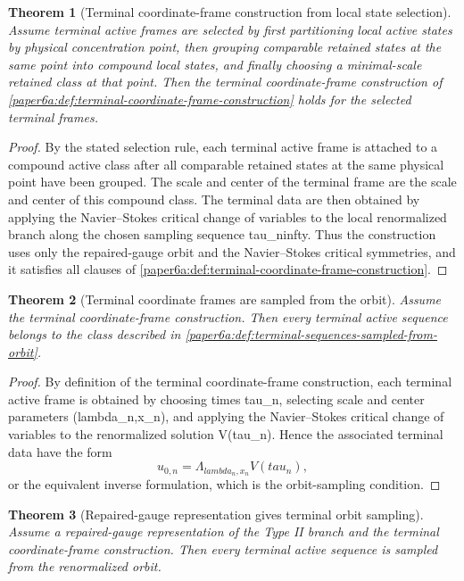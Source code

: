 \documentclass[11pt]{amsart}
\def\({}%
\def\){}%
\def\tau{tau}%
\def\lambda{lambda}%
\def\infty{infty}%
\theoremstyle{plain}
\newtheorem{theorem}{Theorem}[section]
\theoremstyle{definition}
\theoremstyle{remark}
\begin{document}
\begin{theorem}[Terminal coordinate-frame construction from local state selection]
\label{paper6a:thm:terminal-coordinate-frame-construction-profile-selection}
Assume terminal active frames are selected by first partitioning local active
states by physical concentration point, then grouping comparable retained
states at the same point into compound local states, and finally choosing a
minimal-scale retained class at that point.  Then the terminal coordinate-frame
construction of \cref{paper6a:def:terminal-coordinate-frame-construction} holds
for the selected terminal frames.
\end{theorem}

\begin{proof}
By the stated selection rule, each terminal active frame is attached to a
compound active class after all comparable retained states at the same physical
point have been grouped.  The scale and center of the terminal frame are the
scale and center of this compound class.  The terminal data are then obtained
by applying the Navier--Stokes critical change of variables to the local
renormalized branch along the chosen sampling sequence \(\tau_n\to\infty\).
Thus the construction uses only the repaired-gauge orbit and the
Navier--Stokes critical symmetries, and it satisfies all clauses of
\cref{paper6a:def:terminal-coordinate-frame-construction}.
\end{proof}

\begin{theorem}[Terminal coordinate frames are sampled from the orbit]
\label{paper6a:thm:terminal-coordinate-frames-sampled}
Assume the terminal coordinate-frame construction.  Then every terminal active
sequence belongs to the class described in
\cref{paper6a:def:terminal-sequences-sampled-from-orbit}.
\end{theorem}

\begin{proof}
By definition of the terminal coordinate-frame construction, each terminal
active frame is obtained by choosing times \(\tau_n\), selecting scale and
center parameters \((\lambda_n,x_n)\), and applying the Navier--Stokes critical
change of variables to the renormalized solution \(V(\tau_n)\).  Hence the
associated terminal data have the form
\[
  u_{0,n}=\Lambda_{\lambda_n,x_n}V(\tau_n),
\]
or the equivalent inverse formulation, which is the orbit-sampling
condition.
\end{proof}

\begin{theorem}[Repaired-gauge representation gives terminal orbit sampling]
\label{paper6a:thm:representation-gives-terminal-orbit-sampling}
Assume a repaired-gauge representation of the Type II branch and the terminal
coordinate-frame construction.  Then every terminal active sequence is sampled
from the renormalized orbit.
\end{theorem}
\end{document}
